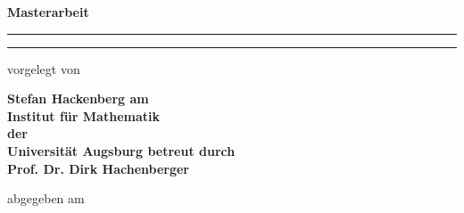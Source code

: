 \documentclass[%
halfparskip*,       %
titlepage,            %
bibtotoc,           %
DIV = 15,
headsepline,
openany,
BCOR=0.8cm,
pointlessnumbers,        %
chapterprefix=true
]
{scrbook}
\theoremstyle{plain}
\theoremstyle{plain}
\theoremstyle{plain}
\theoremstyle{nonumberplain}
\numberwithin{equation}{chapter}
\newcommand{\?}{{\huge \color{red} ?}}
\begin{document}

\frontmatter



\begin{titlepage}
\thispagestyle{empty}
\newcommand{\Rule}{\rule{\textwidth}{1mm}}
\begin{center}\sffamily\bfseries
\LARGE Masterarbeit
\vfill
\Rule\vspace{5mm}
\Huge
\vspace{1mm}\Rule
\vfill
\normalfont\sffamily\large vorgelegt von\par
\bfseries\LARGE Stefan Hackenberg
\vfill
\normalfont\sffamily\large am\\
\bfseries\Large Institut für Mathematik\\
\normalfont\sffamily\large der\\
\bfseries\Large Universität Augsburg
\vfill
\normalfont\sffamily\large betreut durch \\
\bfseries\Large Prof. Dr. Dirk Hachenberger\par
\vfill
\normalfont\sffamily\large abgegeben am \\
\bfseries\Large 
\end{center}
\end{titlepage}


\subject{\large Masterarbeit}
\title{\Huge }
\author{\vspace*{2cm}\\\normalsize von\\\Large Stefan Hackenberg}
\publishers{{\small geschrieben an der} \\ Universität Augsburg}
\end{document}
